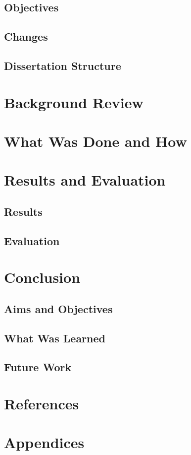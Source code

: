 \documentclass{article}
\begin{document}
    \subsection{Objectives}
    \subsection{Changes}
    \subsection{Dissertation Structure}

    \section{Background Review}

    \section{What Was Done and How}

    \section{Results and Evaluation}
    \subsection{Results}
    \subsection{Evaluation}

    \section{Conclusion}
    \subsection{Aims and Objectives}
    \subsection{What Was Learned}
    \subsection{Future Work}

    \section{References}
    

    \section{Appendices}
\end{document}
